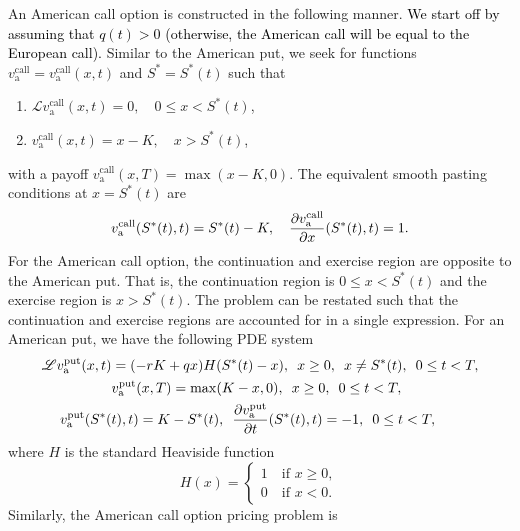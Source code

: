 	An American call option is constructed in the following manner. \textcolor{black}{We start off by assuming that $q(t) > 0$ (otherwise, the American call will be equal to the European call).} Similar to the American put, we seek for functions $v_\text{a}^{\text{call}} = v_\text{a}^{\text{call}}(x,t)$ and $S^* = S^*(t)$ such that
	\begin{enumerate}
			\item $\mathscr{L}v_\text{a}^{\text{call}}(x,t) = 0, \quad 0 \leq x < S^*(t)$,
			\item $v_\text{a}^{\text{call}}(x,t) = x - K, \quad x > S^*(t)$,
	\end{enumerate}
	with a payoff $v_\text{a}^{\text{call}}(x,T) = \max(x-K,0)$. The equivalent smooth pasting conditions at $x = S^*(t)$ are
		\begin{equation*}
			v_\text{a}^{\text{call}}(S^*(t),t) = S^*(t) - K, \quad \frac{\partial v_\text{a}^{\text{call}}}{\partial x}(S^*(t),t) = 1.
		\end{equation*}
	For the American call option, the continuation and exercise region are opposite to the American put. That is, the continuation region is $0 \leq x < S^*(t)$ and the exercise region is $x > S^*(t)$. The problem can be restated such that the continuation and exercise regions are accounted for in a single expression. For an American put, we have the following PDE system
    \begin{align}
            \label{eqn:amerput}
            \mathscr{L}v_\text{a}^{\text{put}}(x,t) &= (-rK + qx)H(S^*(t)-x), \enskip x \geq 0, \enskip x \neq S^*(t), \enskip 0 \leq t < T,\\
            \label{eqn:amerputTerminal}
            &v_\text{a}^{\text{put}}(x,T) = \max(K-x,0), \enskip x \geq 0, \enskip 0 \leq t < T,\\
            \label{eqn:amerputpasting}
           v_\text{a}^{\text{put}}(S^*( & t),t) = K - S^*(t), \enskip \frac{\partial v_\text{a}^{\text{put}}}{\partial t}(S^*(t),t) = -1, \enskip 0 \leq t < T,
    \end{align}
    where $H$ is the standard Heaviside function
      \begin{equation}
      		\label{eqn:heaviside}
          H(x) =
          \begin{cases}
            1 \quad \text{if } x \geq 0, \\
            0 \quad \text{if } x < 0.
        \end{cases}
      \end{equation}
Similarly, the American call option pricing problem is
